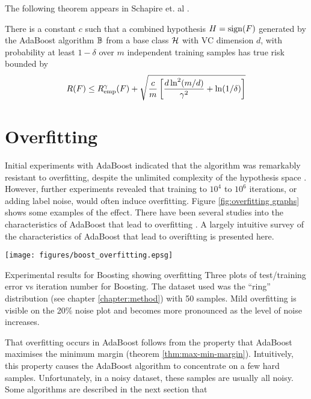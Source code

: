The following theorem appears in Schapire et. al \cite{Schapire97}.

\begin{theorem}[Performance bound for boosting ($p$=1)]

There is a constant $c$ such that a combined hypothesis $H = \mathrm{sign}(F)$
generated by the AdaBoost algorithm $\mathbb{B}$ from a base class $\mathcal{H}$
with VC dimension $d$, with probability at least $1 - \delta$ over $m$
independent training samples has true risk bounded by 
\begin{equation}
R(F) \leq R_{\mathrm{emp}}^{\gamma}(F) + \sqrt{\frac{c}{m} \left[ \frac{d
\ln^2 (m/d)}{\gamma^2} + \ln(1/\delta) \right] }
\end{equation}
\end{theorem}


\section{Overfitting}
\label{sec:boost overfitting}

Initial experiments with AdaBoost indicated that the algorithm was
remarkably resistant to overfitting, despite the unlimited complexity
of the hypothesis space \cite{Freund96}.
However, further experiments \cite{Grove98, Bauer99} revealed that
training to $10^4$ to $10^6$ iterations, or adding label noise, would
often induce overfitting.  Figure \ref{fig:overfitting graphs} shows some
examples of the effect.  There have been several studies into the
characteristics of AdaBoost that lead to overfitting \cite{Schapire97,
Grove98, Ratsch98}.  A largely intuitive survey of the characteristics
of AdaBoost that lead to overiftting is presented here. 

\begin{linefigure}
\begin{center}
\texttt{[image: figures/boost\_overfitting.epsg]}
\end{center}
\begin{capt}{Experimental results for Boosting showing overfitting}
Three plots of test/training error vs iteration number for Boosting.
The dataset used was the ``ring'' distribution (see chapter
\ref{chapter:method}) with 50 samples.  Mild overfitting is visible on
the 20\% noise plot and becomes more pronounced as the level of noise
increases.
\end{capt}
\end{linefigure}

That overfitting occurs in AdaBoost follows from the property that
AdaBoost maximises the minimum margin (theorem
\ref{thm:max-min-margin}).  Intuitively, this property causes the
AdaBoost algorithm to concentrate on a few hard samples.
Unfortunately, in a noisy dataset, these samples are usually all
noisy.  Some algorithms are described in the next section that 

